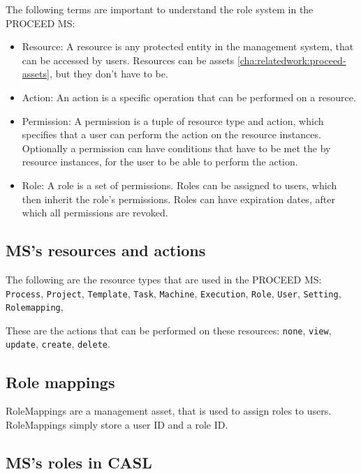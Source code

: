 The following terms are important to understand the role system in the PROCEED MS:

\begin{itemize}
  \item Resource: A resource is any protected entity in the management system, that can be
    accessed by users. Resources can be assets \ref{cha:relatedwork:proceed-assets}, but
    they don't have to be.
  \item Action: An action is a specific operation that can be performed on a resource.
  \item Permission: A permission is a tuple of resource type and action, which specifies that a
    user can perform the action on the resource instances. Optionally a permission can have
    conditions that have to be met the by resource instances, for the user to be able to perform the action.
  \item Role: A role is a set of permissions. Roles can be assigned to users, which then
    inherit the role's permissions. Roles can have expiration dates, after which all
    permissions are revoked.
\end{itemize}

\subsection{MS's resources and actions}
\label{cha:relatedwork:proceedroles:ms-resources-actions}

The following are the resource types that are used in the PROCEED MS:
  \lstinline{Process}, 
  \lstinline{Project},
  \lstinline{Template},
  \lstinline{Task},
  \lstinline{Machine},
  \lstinline{Execution},
  \lstinline{Role},
  \lstinline{User},
  \lstinline{Setting},
  \lstinline{Rolemapping},

These are the actions that can be performed on these resources:
  \lstinline{none},
  \lstinline{view},
  \lstinline{update},
  \lstinline{create},
  \lstinline{delete}.

\subsection{Role mappings}
\label{cha:relatedwork:proceedroles:role-mappings}

RoleMappings are a management asset, that is used to assign roles to users.
RoleMappings simply store a user ID and a role ID.

\subsection{MS's roles in CASL}
\label{cha:relatedwork:proceedroles:casl}

